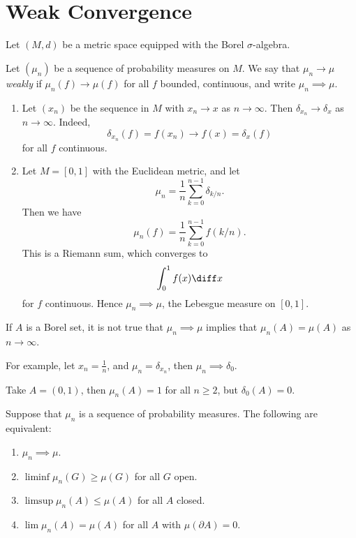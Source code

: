 \documentclass[12pt]{article}
\begin{document}
\newpage

\section{Weak Convergence}%
\label{sec:wc}

Let $(M, d)$ be a metric space equipped with the Borel $\sigma$-algebra.

\begin{definition}
	Let $(\mu_n)$ be a sequence of probability measures on $M$. We say that $\mu_n \to \mu$ \emph{weakly} if $\mu_n(f) \to \mu(f)$ for all $f$ bounded, continuous, and write $\mu_n \implies \mu$.
\end{definition}

\begin{exbox}
	\begin{enumerate}
		\item Let $(x_n)$ be the sequence in $M$ with $x_n \to x$ as $n \to \infty$. Then $\delta_{x_n} \to \delta_x$ as $n \to \infty$. Indeed,
			\[
			\delta_{x_n}(f) = f(x_n) \to f(x) = \delta_x(f)
			\]
			 for all $f$ continuous.
		 \item Let $M = [0, 1]$ with the Euclidean metric, and let
			 \[
			 \mu_n = \frac{1}{n} \sum_{k = 0}^{n-1} \delta_{k/n}.
			 \]
			 Then we have
			 \[
			 \mu_n(f) = \frac{1}{n} \sum_{k = 0}^{n-1} f(k/n).
			 \]
			 This is a Riemann sum, which converges to
			 \[
			 \int_0^1 f(x) \diff x
			 \]
			 for $f$ continuous. Hence $\mu_n \implies \mu$, the Lebesgue measure on $[0, 1]$.
	\end{enumerate}
\end{exbox}

\begin{remark}
	If $A$ is a Borel set, it is not true that $\mu_n \implies \mu$ implies that $\mu_n(A) = \mu(A)$ as $n \to \infty$.

	For example, let $x_n = \frac{1}{n}$, and $\mu_n = \delta_{x_n}$, then $\mu_n \implies \delta_0.$ 

	Take $A = (0, 1)$, then $\mu_n(A) = 1$ for all $n \geq 2$, but $\delta_0(A) = 0$.
\end{remark}

\begin{theorem}
	Suppose that $\mu_n$ is a sequence of probability measures. The following are equivalent:
	\begin{enumerate}[\normalfont(i)]
		\item $\mu_n \implies \mu$.
		\item $\liminf \mu_n(G) \geq \mu(G)$ for all $G$ open.
		\item $\limsup \mu_n(A) \leq \mu(A)$ for all $A$ closed.
		\item $\lim \mu_n(A) = \mu(A)$ for all $A$ with $\mu(\partial A) = 0$.
	\end{enumerate}
\end{theorem}
\end{document}
